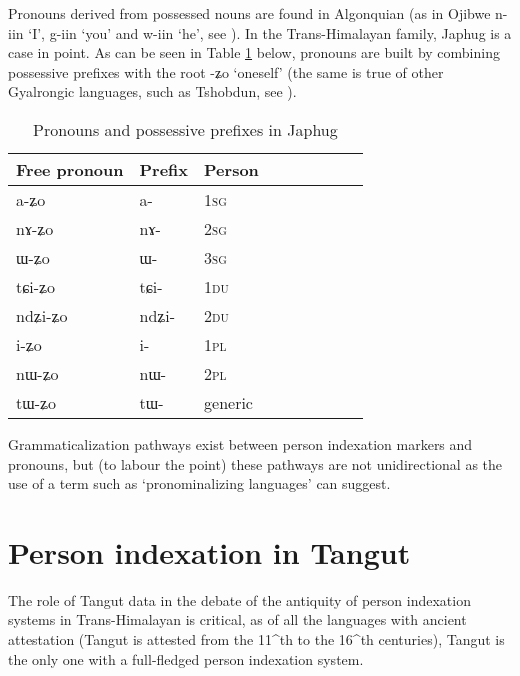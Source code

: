 \documentclass[oldfontcommands,oneside,a4paper,11pt]{article}
\newcommand{\ipa}[1]{{\phon \mbox{#1}}} %
\begin{document}
Pronouns derived from possessed nouns are found in Algonquian (as in Ojibwe \ipa{n-iin} `I', \ipa{g-iin} `you' and \ipa{w-iin} `he', see \citealt{valentine01grammar}). In the Trans-Himalayan family, Japhug is a case in point. As can be seen in Table \ref{tab:pronoun} below, pronouns are built by combining possessive prefixes with the root \ipa{-ʑo} `oneself' (the same is true of other Gyalrongic languages, such as Tshobdun, see \citealt[113]{jackson98morphology}).

 \begin{table}[H] \centering
\caption{Pronouns and possessive prefixes in Japhug}\label{tab:pronoun}
\begin{tabular}{lllllllll} 
\toprule
 Free pronoun & Prefix & Person\\
\midrule
 \ipa{a-ʑo}  &	\ipa{a-}  &		1\textsc{sg} \\
\ipa{nɤ-ʑo}  &	\ipa{nɤ-}  &			2\textsc{sg}\\
\ipa{ɯ-ʑo}  &	\ipa{ɯ-}  &			3\textsc{sg}\\
\midrule
\ipa{tɕi-ʑo}  &	\ipa{tɕi-}  &			1\textsc{du} \\
\ipa{ndʑi-ʑo}  &	\ipa{ndʑi-}  &		2\textsc{du} \\	
\midrule
\ipa{i-ʑo}    &	\ipa{i-}  &			1\textsc{pl} \\
\ipa{nɯ-ʑo}   &	\ipa{nɯ-}  &			2\textsc{pl} \\
\midrule
\ipa{tɯ-ʑo} & \ipa{tɯ-}   &  generic\\
\bottomrule
\end{tabular}
\end{table}

 Grammaticalization pathways exist between person indexation markers and pronouns, but (to labour the point) these pathways are not unidirectional as the use of a term such as `pronominalizing languages' can suggest.  

\section{Person indexation in Tangut}
The role of Tangut data in the debate of the antiquity of person indexation systems in Trans-Himalayan is critical, as of all the languages with ancient attestation (Tangut is attested from the 11^{th} to the 16^{th} centuries), Tangut is the only one with a full-fledged person indexation system.


\end{document}

